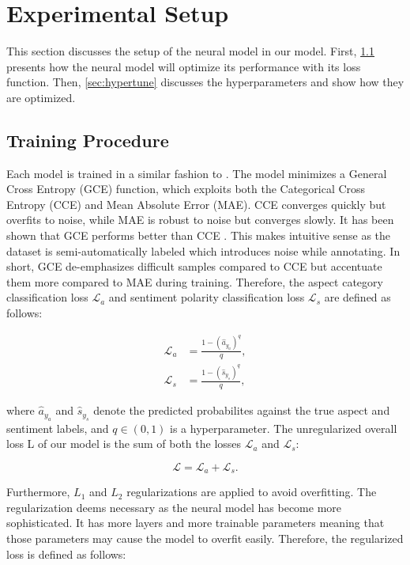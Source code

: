 \documentclass[american, oneside]{ecsgdp}
\begin{document}
\section{Experimental Setup} \label{sec:setup}
This section discusses the setup of the neural model in our model. First, \cref{sec:training} presents how the neural model will optimize its performance with its loss function. Then, \cref{sec:hypertune} discusses the hyperparameters and show how they are optimized.

\subsection{Training Procedure} \label{sec:training}
Each model is trained in a similar fashion to \textcite{Kumar2021CASC}. The model minimizes a General Cross Entropy (GCE) function, which exploits both the Categorical Cross Entropy (CCE) and Mean Absolute Error (MAE). %
CCE converges quickly but overfits to noise, while MAE is robust to noise but converges slowly. It has been shown that GCE performs better than CCE \parencite{Kumar2021CASC}. This makes intuitive sense as the dataset is semi-automatically labeled which introduces noise while annotating. In short, GCE de-emphasizes difficult samples compared to CCE but accentuate them more compared to MAE during training. Therefore, the aspect category classification loss $\mathcal{L}_a$ and sentiment polarity classification loss $\mathcal{L}_s$ are defined as follows:

\begin{align}
  \mathcal{L}_a & = \frac{1 - \left( \hat{a}_{y_a} \right)^q} {q}, \\
  \mathcal{L}_s & = \frac{1 - \left( \hat{s}_{y_s} \right)^q} {q},
\end{align}

\noindent where $\hat{a}_{y_a}$ and $\hat{s}_{y_s}$ denote the predicted probabilites against the true aspect and sentiment labels, and $q \in (0, 1)$ is a hyperparameter. The unregularized overall loss L of our model is the sum of both the losses $\mathcal{L}_a$ and $\mathcal{L}_s$:

\begin{equation}
    \mathcal{L} = \mathcal{L}_a + \mathcal{L}_s.
\end{equation}

Furthermore, $L_1$ and $L_2$ regularizations are applied to avoid overfitting. The regularization deems necessary as the neural model has become more sophisticated. It has more layers and more trainable parameters meaning that those parameters may cause the model to overfit easily. Therefore, the regularized loss is defined as follows:
\end{document}
